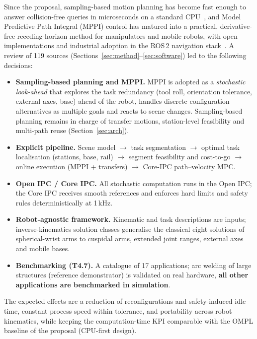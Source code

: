 Since the proposal, sampling-based motion planning has become fast enough to answer collision-free queries in microseconds on a standard CPU~\cite{thomason2024vamp}, and Model Predictive Path Integral (MPPI) control has matured into a practical, derivative-free receding-horizon method for manipulators and mobile robots, with open implementations and industrial adoption in the ROS\,2 navigation stack~\cite{williams2018tro,bhardwaj2021storm,macenski2023nav2survey}. A review of 119 sources (Sections~\ref{sec:method}--\ref{sec:software}) led to the following decisions:
\begin{itemize}
\item \textbf{Sampling-based planning and MPPI.} MPPI is adopted as a \emph{stochastic look-ahead} that explores the task redundancy (tool roll, orientation tolerance, external axes, base) ahead of the robot, handles discrete configuration alternatives as multiple goals and reacts to scene changes. Sampling-based planning remains in charge of transfer motions, station-level feasibility and multi-path reuse (Section~\ref{sec:arch}).
\item \textbf{Explicit pipeline.} Scene model $\rightarrow$ task segmentation $\rightarrow$ optimal task localisation (stations, base, rail) $\rightarrow$ segment feasibility and cost-to-go $\rightarrow$ online execution (MPPI + transfers) $\rightarrow$ Core-IPC path--velocity MPC.
\item \textbf{Open IPC / Core IPC.} All stochastic computation runs in the Open IPC; the Core IPC receives smooth references and enforces hard limits and safety rules deterministically at 1\,kHz.
\item \textbf{Robot-agnostic framework.} Kinematic and task descriptions are inputs; inverse-kinematics solution classes generalise the classical eight solutions of spherical-wrist arms to cuspidal arms, extended joint ranges, external axes and mobile bases.
\item \textbf{Benchmarking (T4.7).} A catalogue of 17 applications; arc welding of large structures (reference demonstrator) is validated on real hardware, \textbf{all other applications are benchmarked in simulation}.
\end{itemize}
The expected effects are a reduction of reconfigurations and safety-induced idle time, constant process speed within tolerance, and portability across robot kinematics, while keeping the computation-time KPI comparable with the OMPL baseline of the proposal (CPU-first design).
